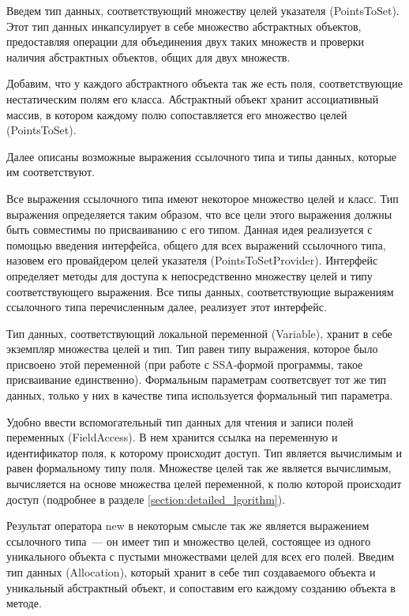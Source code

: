 \documentclass[14pt,titlepage]{extarticle}
\newcommand{\eng}[1]{{\English#1}}
\begin{document}
      Введем тип данных, соответствующий множеству целей указателя
      (\eng{PointsToSet}). Этот тип данных инкапсулирует в себе множество
      абстрактных объектов, предоставляя операции для объединения двух таких
      множеств и проверки наличия абстрактных объектов, общих для двух
      множеств.

      Добавим, что у каждого абстрактного объекта так же есть поля,
      соответствующие нестатическим полям его класса. Абстрактный объект
      хранит ассоциативный массив, в котором каждому полю сопоставляется его
      множество целей (\eng{PointsToSet}).

      Далее описаны возможные выражения ссылочного типа и типы данных, которые
      им соответствуют.

      Все выражения ссылочного типа имеют некоторое множество целей и класс.
      Тип выражения определяется таким образом, что все цели этого выражения
      должны быть совместимы по присваиванию с его типом. Данная идея
      реализуется с помощью введения интерфейса, общего для всех выражений
      ссылочного типа, назовем его провайдером целей указателя
      (\eng{PointsToSetProvider}). Интерфейс определяет методы для доступа к
      непосредственно множеству целей и типу соответствующего выражения.
      Все типы данных, соответствующие выражениям ссылочного типа перечисленным
      далее, реализует этот интерфейс.

      Тип данных, соответствующий локальной переменной (\eng{Variable}), хранит
      в себе экземпляр множества целей и тип. Тип равен типу выражения, которое
      было присвоено этой переменной (при работе с SSA-формой программы, такое
      присваивание единственно). Формальным параметрам соответсвует тот же тип
      данных, только у них в качестве типа используется формальный тип
      параметра.

      Удобно ввести вспомогательный тип данных для чтения и записи полей
      переменных (\eng{FieldAccess}). В нем хранится ссылка на переменную и
      идентификатор поля, к которому происходит доступ. Тип является вычислимым
      и равен формальному типу поля. Множестве целей так же является
      вычислимым, вычисляется на основе множества целей переменной, к полю
      которой происходит доступ (подробнее в разделе
      \ref{section:detailed_lgorithm}).

      Результат оператора \eng{new} в некоторым смысле так же является
      выражением ссылочного типа~--- он имеет тип и множество целей, состоящее
      из одного уникального объекта с пустыми множествами целей для всех его
      полей. Введим тип данных (\eng{Allocation}), который хранит в себе тип
      создаваемого объекта и уникальный абстрактный объект, и сопоставим его
      каждому созданию объекта в методе.
\end{document}
